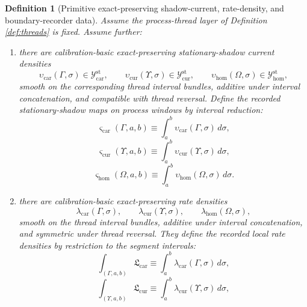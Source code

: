\documentclass[11pt]{article}
\newcommand{\TensorStatTagClass}{\mathcal Y_{\mathrm{car}}^{\mathrm{st}}}
\newcommand{\CurStatTagClass}{\mathcal Y_{\mathrm{cur}}^{\mathrm{st}}}
\newcommand{\HomStatTagClass}{\mathcal Y_{\mathrm{hom}}^{\mathrm{st}}}
\newcommand{\TensorStatTag}{\varsigma_{\mathrm{car}}}
\newcommand{\CurStatTag}{\varsigma_{\mathrm{cur}}}
\newcommand{\HomStatTag}{\varsigma_{\mathrm{hom}}}
\newcommand{\TensorLocalRate}{\mathfrak L_{\mathrm{car}}}
\newcommand{\CurLocalRate}{\mathfrak L_{\mathrm{cur}}}
\newcommand{\TensorShadowDensity}{\upsilon_{\mathrm{car}}}
\newcommand{\CurShadowDensity}{\upsilon_{\mathrm{cur}}}
\newcommand{\HomShadowDensity}{\upsilon_{\mathrm{hom}}}
\newcommand{\TensorRateDensity}{\lambda_{\mathrm{car}}}
\newcommand{\CurRateDensity}{\lambda_{\mathrm{cur}}}
\newcommand{\HomRateDensity}{\lambda_{\mathrm{hom}}}
\newtheorem{definition}{Definition}
\begin{document}
\begin{definition}[Primitive exact-preserving shadow-current, rate-density, and boundary-recorder data]
\label{def:shadow_rate_recorder}
Assume the process-thread layer of Definition \ref{def:threads} is fixed. Assume further:
\begin{enumerate}
    \item there are calibration-basic exact-preserving stationary-shadow current densities
    \[
    \TensorShadowDensity(\Gamma,\sigma)\in\TensorStatTagClass,\qquad
    \CurShadowDensity(\Upsilon,\sigma)\in\CurStatTagClass,\qquad
    \HomShadowDensity(\Omega,\sigma)\in\HomStatTagClass,
    \]
    smooth on the corresponding thread interval bundles, additive under interval concatenation, and compatible with thread reversal. Define the recorded stationary-shadow maps on process windows by interval reduction:
    \begin{equation}
    \TensorStatTag(\Gamma,a,b)\equiv\int_a^b \TensorShadowDensity(\Gamma,\sigma)\,d\sigma,
    \label{eq:shadow_car}
    \end{equation}
    \begin{equation}
    \CurStatTag(\Upsilon,a,b)\equiv\int_a^b \CurShadowDensity(\Upsilon,\sigma)\,d\sigma,
    \label{eq:shadow_cur}
    \end{equation}
    \begin{equation}
    \HomStatTag(\Omega,a,b)\equiv\int_a^b \HomShadowDensity(\Omega,\sigma)\,d\sigma.
    \label{eq:shadow_hom}
    \end{equation}
    \item there are calibration-basic exact-preserving rate densities
    \[
    \TensorRateDensity(\Gamma,\sigma),\qquad
    \CurRateDensity(\Upsilon,\sigma),\qquad
    \HomRateDensity(\Omega,\sigma),
    \]
    smooth on the thread interval bundles, additive under interval concatenation, and symmetric under thread reversal. They define the recorded local rate densities by restriction to the segment intervals:
    \begin{equation}
    \int_{(\Gamma,a,b)}\TensorLocalRate
    \equiv
    \int_a^b \TensorRateDensity(\Gamma,\sigma)\,d\sigma,
    \label{eq:local_rate_car}
    \end{equation}
    \begin{equation}
    \int_{(\Upsilon,a,b)}\CurLocalRate
    \equiv
    \int_a^b \CurRateDensity(\Upsilon,\sigma)\,d\sigma,
    \label{eq:local_rate_cur}
    \end{equation}
    \begin{equation}

\end{equation}
\end{enumerate}
\end{definition}
\end{document}
